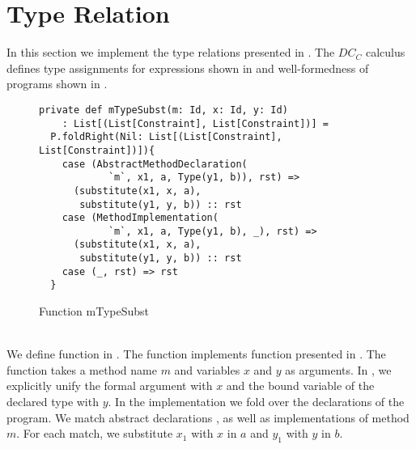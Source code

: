 \section{Type Relation}
\label{sec:types}
In this section we implement the type relations presented in .
The $DC_C$ calculus defines type assignments for expressions
shown in 
and well-formedness of programs shown in .
%
\begin{figure}[h]
\begin{lstlisting}
private def mTypeSubst(m: Id, x: Id, y: Id)
    : List[(List[Constraint], List[Constraint])] =
  P.foldRight(Nil: List[(List[Constraint], List[Constraint])]){
    case (AbstractMethodDeclaration(
            `m`, x1, a, Type(y1, b)), rst) =>
      (substitute(x1, x, a),
       substitute(y1, y, b)) :: rst
    case (MethodImplementation(
            `m`, x1, a, Type(y1, b), _), rst) =>
      (substitute(x1, x, a),
       substitute(y1, y, b)) :: rst
    case (_, rst) => rst
  }
\end{lstlisting}
\caption{Function mTypeSubst}
\label{fig:scala-mtype}
\end{figure}\\
We define function  in .
The function implements function 
presented in .
The function takes a method name $m$ and
variables $x$ and $y$ as arguments.
In , we explicitly unify the formal argument
with $x$ and the bound variable of the declared type with $y$.
In the implementation we fold over the declarations of the program.
We match abstract declarations ,
as well as implementations  of method $m$.
For each match, we substitute $x_1$ with $x$ in $a$ and $y_1$ with $y$ in $b$.


